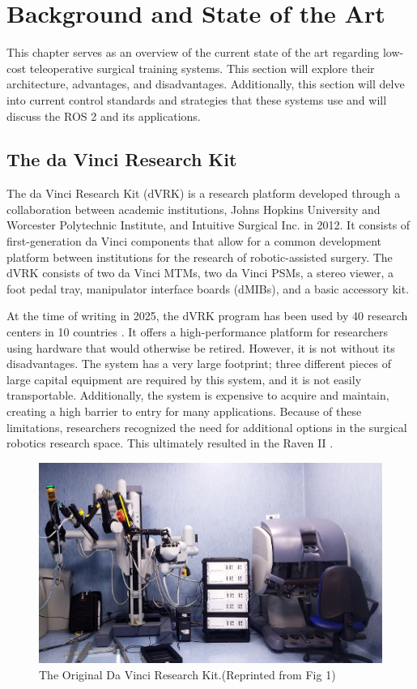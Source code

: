 \chapter{Background and State of the Art}
This chapter serves as an overview of the current state of the art regarding low-cost teleoperative surgical training systems. This section will explore their architecture, advantages, and disadvantages. Additionally, this section will delve into current control standards and strategies that these systems use and will discuss the ROS 2 and its applications.

\section{The da Vinci Research Kit}  
The da Vinci Research Kit (dVRK) is a research platform developed through a collaboration between academic institutions, Johns Hopkins University and Worcester Polytechnic Institute, and Intuitive Surgical Inc. in 2012. It consists of first-generation da Vinci components that allow for a common development platform between institutions for the research of robotic-assisted surgery. The dVRK consists of two da Vinci MTMs, two da Vinci PSMs, a stereo viewer, a foot pedal tray, manipulator interface boards (dMIBs), and a basic accessory kit. \cite{DVRKComponents}

At the time of writing in 2025, the dVRK program has been used by 40 research centers in 10 countries \cite{DVRKRTD}. It offers a high-performance platform for researchers using hardware that would otherwise be retired. However, it is not without its disadvantages. The system has a very large footprint; three different pieces of large capital equipment are required by this system, and it is not easily transportable. Additionally, the system is expensive to acquire and maintain, creating a high barrier to entry for many applications. Because of these limitations, researchers recognized the need for additional options in the surgical robotics research space. This ultimately resulted in the Raven II \cite{6363574}.

\begin{figure}[H]
    \centering
    \includegraphics[width=0.75\linewidth]{figures/DVRK.png}
    \caption{The Original Da Vinci Research Kit.(Reprinted from \cite{Fontanelli2017ModellingAI} Fig 1)}
    \label{fig:DVRK}
\end{figure}



